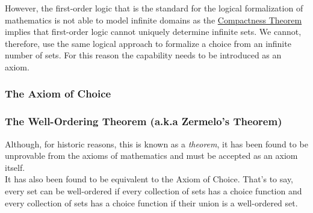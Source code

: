 \documentclass[MathsNotesBase.tex]{subfiles}
\begin{document}
{		However, the first-order logic that is the standard for the logical formalization of mathematics is not able to model infinite domains as the \href{https://en.wikipedia.org/wiki/Compactness_theorem}{Compactness Theorem} implies that first-order logic cannot uniquely determine infinite sets. We cannot, therefore, use the same logical approach to formalize a choice from an infinite number of sets. For this reason the capability needs to be introduced as an axiom.
		
		\bigskip
		\subsubsection{The Axiom of Choice}\label{sssection:axiom-of-choice}
		
		
		\subsubsection{The Well-Ordering Theorem (a.k.a Zermelo's Theorem)}
		
		
		Although, for historic reasons, this is known as a \textit{theorem}, it has been found to be unprovable from the axioms of mathematics and must be accepted as an axiom itself.\\
		
		It has also been found to be equivalent to the Axiom of Choice. That's to say, every set can be well-ordered if every collection of sets has a choice function and every collection of sets has a choice function if their union is a well-ordered set.\\
		
}
\end{document}
